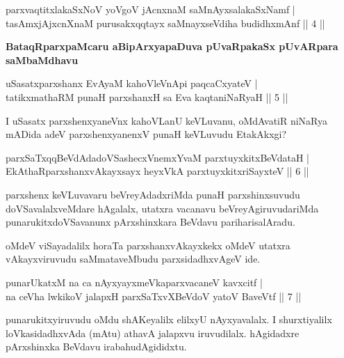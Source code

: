 \begin{shl}
parxvaqtitxlakaSxNoV yoVgoV jAcnxnaM saMnAyxsalakaSxNamf |\\
tasAmxjAjxcnXnaM purusakxqqtayx saMnayxseVdiha budidhxmAnf \hfill || 4 ||
\end{shl}

\begin{artha}%
\textbf{BataqRparxpaMcaru aBipArxyapaDuva pUvaRpakaSx pUvARpara saMbaMdhavu}
\end{artha}

\begin{shl}
uSasatxparxshanx EvAyaM kahoVleVnApi paqcaCxyateV |\\
tatikxmathaRM punaH parxshanxH sa Eva kaqtaniNaRyaH \hfill || 5 ||
\end{shl}

\begin{artha}
I uSasatx parxshenxyaneVnx kahoVLanU keVLuvanu, oMdAvatiR niNaRya mADida adeV parxshenxyanenxV punaH keVLuvudu EtakAkxgi?
\end{artha}

\begin{shl}
parxSaTxqqBeVdAdadoVSashecxVnemxYvaM parxtuyxkitxBeVdataH |\\
EkAthaRparxshanxvAkayxsayx heyxVkA parxtuyxkitxriSayxteV \hfill || 6 ||
\end{shl}

\begin{artha}
parxshenx keVLuvavaru beVreyAdadxriMda punaH parxshinxsuvudu doVSavalalxveMdare hAgalalx, utatxra vacanavu beVreyAgiruvudariMda punarukitxdoVSavanunx pArxshinxkara BeVdavu pariharisalAradu.

oMdeV viSayadalilx horaTa parxshanxvAkayxkekx oMdeV utatxra vAkayxviruvudu saMmataveMbudu parxsidadhxvAgeV ide. 
\end{artha}

\begin{shl}
punarUkatxM na ca nAyxyayxmeVkaparxvacaneV kavxcitf |\\
na ceVha lwkikoV jalapxH parxSaTxvXBeVdoV yatoV BaveVtf \hfill || 7 ||
\end{shl}

\begin{artha}
punarukitxyiruvudu oMdu shAKeyalilx elilxyU nAyxyavalalx. I shurxtiyalilx loVkasidadhxvAda (mAtu) athavA jalapxvu iruvudilalx. hAgidadxre pArxshinxka BeVdavu irabahudAgididxtu.
\end{artha}


